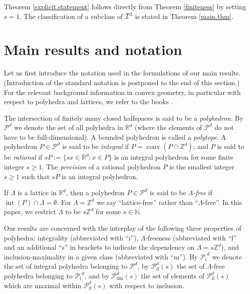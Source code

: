 \documentclass[a4paper]{article}
\theoremstyle{plain}
\begin{document}
Theorem \ref{explicit.statement} follows directly from
Theorem \ref{finiteness} by setting $s = 1$.
The classification of a subclass of ${\cal I}^3$ is stated
in Theorem \ref{main.thm}.

\section{Main results and notation}

Let us first introduce the notation used in the formulations
of our main results.
(Introduction of the standard notation is postponed to the
end of this section.)
For the relevant background information in convex geometry,
in particular with respect to polyhedra and lattices, we
refer to the books
\cite{barvinok-2002,gruber-2007,gruber-lekkerkerker-1987,Rockafellar72}.

The intersection of finitely many closed halfspaces is said
to be a {\emph{{polyhedron}}}.
By ${\mathcal{P}}^d$ we denote the set of all polyhedra in ${\mathbb{R}}^d$
(where the elements of ${\mathcal{P}}^d$ do not have to be
full-dimensional).
A bounded polyhedron is called a {\emph{{polytope}}}.
A polyhedron $P \in {\mathcal{P}}^d$ is said to be {\emph{{integral}}} if
$P = {{\mathop{\mathrm{{conv}}}}}(P \cap {\mathbb{Z}}^d)$;
and $P$ is said to be \emph{rational} if $sP := \{sx \in
{\mathbb{R}}^d : x \in P\}$ is an integral polyhedron for some
finite integer $s \ge 1$.
The \emph{precision} of a rational polyhedron $P$ is the
smallest integer $s \ge 1$ such that $sP$ is an integral
polyhedron.

If $\Lambda$ is a lattice in ${\mathbb{R}}^d$, then a polyhedron $P
\in {\mathcal{P}}^d$ is said to be {\emph{{$\Lambda$-free}}} if ${{\mathop{\mathrm{{int}}}}}(P)
\cap \Lambda = \emptyset$.
For $\Lambda={\mathbb{Z}}^d$ we say ``lattice-free'' rather than
``$\Lambda$-free''.
In this paper, we restrict $\Lambda$ to be $s {\mathbb{Z}}^d$
for some $s \in {\mathbb{N}}$. 

Our results are concerned with the interplay of the
following three properties of polyhedra:
integrality (abbreviated with ``i''),
$\Lambda$-freeness (abbreviated with ``f'' and an additional
``s'' in brackets to indicate the dependency on $\Lambda = s
{\mathbb{Z}}^d$), and inclusion-maximality in a given class
(abbreviated with ``m''). 
By ${{\mathcal{P}}_{{\mathop{\mathrm{{i}}}}}}^d$ we denote the set of integral polyhedra
belonging to ${\mathcal{P}}^d$, by ${{\mathcal{P}}_{{\mathop{\mathrm{{if}}}}}^{{d}}({s})}$ the set of
$\Lambda$-free polyhedra belonging to ${{\mathcal{P}}_{{\mathop{\mathrm{{i}}}}}}^d$, and by
${{\mathcal{P}}_{{\mathop{\mathrm{{ifm}}}}}^{{d}}({s})}$ the set of elements of ${{\mathcal{P}}_{{\mathop{\mathrm{{if}}}}}^{{d}}({s})}$ which
are maximal within ${{\mathcal{P}}_{{\mathop{\mathrm{{if}}}}}^{{d}}({s})}$ with respect to inclusion.
\end{document}
